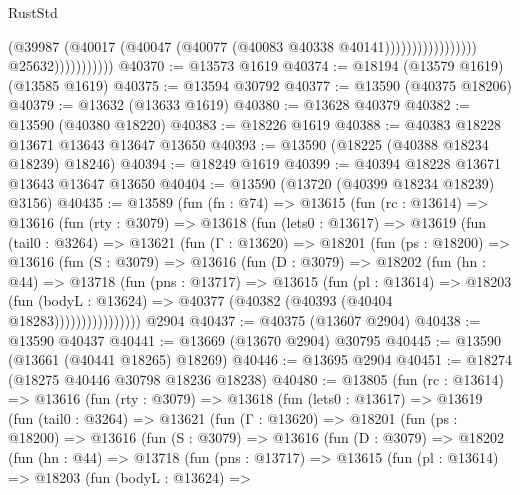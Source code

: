 \begin{lexlean}{RustStd}
\begin{coremodule}
                                                  (@39987
                                                    (@40017
                                                      (@40047
                                                        (@40077
                                                          (@40083 @40338 @40141)))))))))))))))))
                          @25632)))))))))))
@40370 := @13573 @1619
@40374 := @18194 (@13579 @1619) (@13585 @1619)
@40375 := @13594 @30792
@40377 := @13590 (@40375 @18206)
@40379 := @13632 (@13633 @1619)
@40380 := @13628 @40379
@40382 := @13590 (@40380 @18220)
@40383 := @18226 @1619
@40388 := @40383 @18228 @13671 @13643 @13647 @13650
@40393 := @13590 (@18225 (@40388 @18234 @18239) @18246)
@40394 := @18249 @1619
@40399 := @40394 @18228 @13671 @13643 @13647 @13650
@40404 := @13590 (@13720 (@40399 @18234 @18239) @3156)
@40435 := @13589
    (fun (fn : @74) =>
    @13615
      (fun (rc : @13614) =>
      @13616
        (fun (rty : @3079) =>
        @13618
          (fun (lets0 : @13617) =>
          @13619
            (fun (tail0 : @3264) =>
            @13621
              (fun (Γ : @13620) =>
              @18201
                (fun (ps : @18200) =>
                @13616
                  (fun (S : @3079) =>
                  @13616
                    (fun (D : @3079) =>
                    @18202
                      (fun (hn : @44) =>
                      @13718
                        (fun (pns : @13717) =>
                        @13615
                          (fun (pl : @13614) =>
                          @18203
                            (fun (bodyL : @13624) =>
                            @40377 (@40382 (@40393 (@40404 @18283))))))))))))))))
    @2904
@40437 := @40375 (@13607 @2904)
@40438 := @13590 @40437
@40441 := @13669 (@13670 @2904) @30795
@40445 := @13590 (@13661 (@40441 @18265) @18269)
@40446 := @13695 @2904
@40451 := @18274 (@18275 @40446 @30798 @18236 @18238)
@40480 := @13805
    (fun (rc : @13614) =>
    @13616
      (fun (rty : @3079) =>
      @13618
        (fun (lets0 : @13617) =>
        @13619
          (fun (tail0 : @3264) =>
          @13621
            (fun (Γ : @13620) =>
            @18201
              (fun (ps : @18200) =>
              @13616
                (fun (S : @3079) =>
                @13616
                  (fun (D : @3079) =>
                  @18202
                    (fun (hn : @44) =>
                    @13718
                      (fun (pns : @13717) =>
                      @13615
                        (fun (pl : @13614) =>
                        @18203
                          (fun (bodyL : @13624) =>

\end{coremodule}
\end{lexlean}

